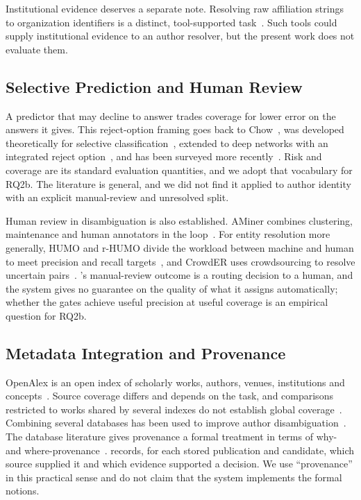Institutional evidence deserves a separate note. Resolving raw affiliation strings to organization identifiers is a distinct, tool-supported task~\cite{duran-silva-etal-2024-affilgood,kallipoliti2025affro}. Such tools could supply institutional evidence to an author resolver, but the present work does not evaluate them.

\subsection{Selective Prediction and Human Review}
A predictor that may decline to answer trades coverage for lower error on the answers it gives. This reject-option framing goes back to Chow~\cite{chow1970reject}, was developed theoretically for selective classification~\cite{elyaniv2010foundations}, extended to deep networks with an integrated reject option~\cite{geifman2019selectivenet}, and has been surveyed more recently~\cite{hendrickx2024reject}. Risk and coverage are its standard evaluation quantities, and we adopt that vocabulary for RQ2b. The literature is general, and we did not find it applied to author identity with an explicit manual-review and unresolved split.

Human review in disambiguation is also established. AMiner combines clustering, maintenance and human annotators in the loop~\cite{zhang2018aminerhitl}. For entity resolution more generally, HUMO and r-HUMO divide the workload between machine and human to meet precision and recall targets~\cite{chen2018humo,hou2020rhumo}, and CrowdER uses crowdsourcing to resolve uncertain pairs~\cite{wang2012crowder}. \hammer{}'s manual-review outcome is a routing decision to a human, and the system gives no guarantee on the quality of what it assigns automatically; whether the gates achieve useful precision at useful coverage is an empirical question for RQ2b.

\subsection{Metadata Integration and Provenance}
OpenAlex is an open index of scholarly works, authors, venues, institutions and concepts~\cite{priem2022openalex}. Source coverage differs and depends on the task, and comparisons restricted to works shared by several indexes do not establish global coverage~\cite{culbert2025openalexcoverage}. Combining several databases has been used to improve author disambiguation~\cite{zhang2021aggand,choi2024heterogeneoussites}. The database literature gives provenance a formal treatment in terms of why- and where-provenance~\cite{buneman2001whyandwhere}. \hammer{} records, for each stored publication and candidate, which source supplied it and which evidence supported a decision. We use ``provenance'' in this practical sense and do not claim that the system implements the formal notions.

